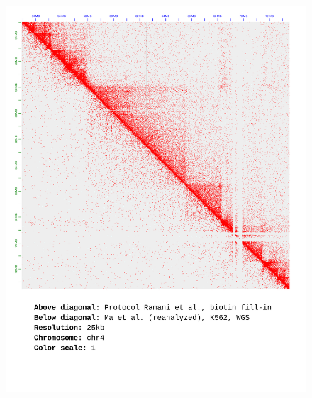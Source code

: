 \documentclass[a4paper,14pt]{extarticle}
\begin{document}
\begin{figure}[hp!] \includegraphics[width=1\textwidth]{ma-wgs_s30_chr4_25kb_1.pdf} \end{figure}
\end{document}
